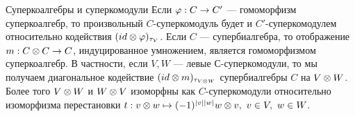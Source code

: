 \begin{subsection}{Суперкоалгебры и суперкомодули}
  Если $ \varphi: C \to C' $ --- гомоморфизм суперкоалгебр, то произвольный
  $ C $-суперкомодуль будет и $ C' $-суперкомодулем относительно
  кодействия $ (id \otimes \varphi)_{\tau_V} $. Если $ C $ --- супербиалгебра, то
  отображение $ m: C \otimes C \to C $, индуцированное умножением,
  является гомоморфизмом суперкоалгебр. В частности, если
  $ V, W $ --- левые $С$-суперкомодули, то мы получаем диагональное
  кодействие $ (id \otimes m)_{\tau_{V \otimes W}} $ супербиалгебры $ C $ на $ V \otimes W $.
  Более того $ V \otimes W $ и $ W \otimes V $ изоморфны как $C$-суперкомодули относительно
  изоморфизма перестановки $ t: v \o w \mapsto \sgn{v}{w} w \o v, ~v \in V, ~w \in W $.

\end{subsection}